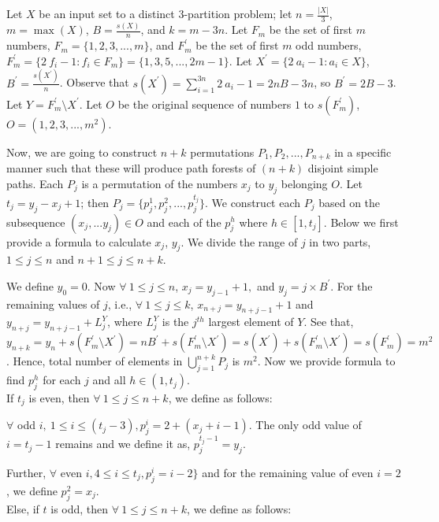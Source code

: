 Let $X$ be an input set to a distinct 3-partition problem; let $n=\frac{|X|}{3}$, $m = \max (X)$, $B = \frac{s(X)}{n}$, and $k=m-3n$. Let $F_m$ be the set of first $m$ numbers, $F_m = \{1,2,3,...,m\}$, and $F^{\prime}_m$ be the set of first $m$ odd numbers, $F^\prime_m = \{2\ f_i-1: f_i \in F_m\} = \{1, 3, 5, . . ., 2m-1\}$. Let $X^\prime = \{2\ a_i-1:a_i \in X\}$, $B^\prime = \frac{s(X^\prime)}{n}$. Observe that $s(X^\prime) = \sum_{i=1}^{3n} 2\ a_i -1 = 2nB-3n$, so $B^\prime = 2B-3$. Let $Y=F^\prime_m\setminus X^\prime$. Let $O$ be the original sequence of numbers $1$ to $s(F^\prime_m)$, $O=(1,2,3,...,m^2)$.

Now, we are going to construct $n+k$ permutations $P_1, P_2,..., P_{n+k}$ in a specific manner such that these will produce path forests of $(n+k)$ disjoint simple paths. Each $P_j$ is a permutation of the numbers $x_j$ to $y_j$ belonging $O$.
Let $t_j=y_j-x_j+1$; then $P_j = \{p^1_j,p^2_j,...,p^{t_j}_j\}$.
We construct each $P_j$ based on the subsequence $(x_j,... y_j) \in O$ and each of the $p^h_j$ where $h \in [1, t_j]$. Below we first provide a formula to calculate $x_j$, $y_j$. We divide the range of $j$ in two parts, $1\leq j\leq n$ and $n+1\leq j\leq n+k$.

We define $y_0=0$. Now $\forall\ 1\leq j\leq n$, $x_j = y_{j-1}+1,$ and $y_j = j \times B^\prime$.
For the remaining values of $j$, i.e., $\forall\ 1\leq j\leq k$, $x_{n+j} = y_{n+j-1}+1$ and  $y_{n+j} = y_{n+j-1} + L^Y_j$, where $L^Y_j$ is the $j^{th}$ largest element of $Y$. See that, $y_{n+k} = y_n + s(F^\prime_m\setminus X^\prime) = nB^\prime + s(F^\prime_m\setminus X^\prime) = s(X^\prime) + s(F^\prime_m\setminus X^\prime) = s(F^\prime_m) = m^2$. Hence, total number of elements in $\bigcup^{n+k}_{j=1} P_j$ is $m^2$. Now we provide formula to find $p^h_j$ for each $j$ and all $h \in (1, t_j)$.\\

\noindent If $t_j$ is even, then $\forall\ 1\leq j \leq n+k$, we define as follows:

$\forall$ odd $i,\ 1 \leq i \leq (t_j-3), p^i_j = 2+(x_j+i-1)$.
The only odd value of $i=t_j-1$ remains and we define it as, $p^{t_j-1}_j = y_j$.

Further, $\forall$ even $i, 4 \leq i \leq t_j, p^i_j = i-2\}$ and for the remaining value of even $i=2$, we define $p^2_j = x_j$.\\

\noindent Else, if $t$ is odd, then $\forall\ 1\leq j \leq n+k$, we define as follows:

